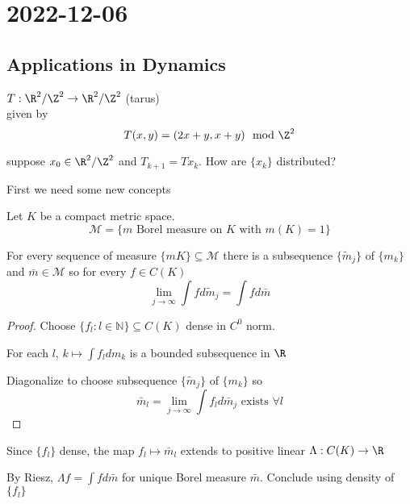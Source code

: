 \section{2022-12-06}

\subsection{Applications in Dynamics}

\begin{definition}
	$T : \R^2 / \Z^2 \to \R^2 / \Z^2$ (tarus) \\
	given by
	\[
		T(x,y) = (2x + y, x+y) \mod{\Z^2}
	\] 
\end{definition}

suppose $x_0 \in \R^2 / \Z^2$ and $T_{k+1} = T x_{k}$. How are $\{x_k\}$ distributed?


First we need some new concepts

\begin{definition}
	Let $K$ be a compact metric space.
	\[
		\mathcal{M} = \{ m \text{ Borel measure on $K$ with } m(K) = 1 \}
	\] 
\end{definition}

\begin{theorem}
	For every sequence of measure $\{m K \} \subseteq \mathcal{M}$ there is a subsequence
	$\{ \tilde{m}_{j}\}$ of $\{ m_k\}$ and $\bar{m} \in \mathcal{M}$ so for every $f \in C(K)$
	 \[
		 \lim_{j \to \infty} \int f d\tilde{m}_{j} = \int f d \bar{m}
	\] 
\end{theorem}

\begin{proof}
	Choose $\{ f_l : l \in \mathbb{N} \} \subseteq C(K)$ dense in $C^0$ norm.

	For each $l$, $k \mapsto \int f_{l} dm_k$ is a bounded subsequence in $\R$ 

	Diagonalize to choose subsequence $\{\tilde{m}_{j} \}$ of $\{m_k \}$ so
	\[
		\bar{m}_{l} = \lim_{j \to \infty} \int f_{l} d \bar{m}_j \text{ exists } \forall l
	\] 
\end{proof}

\begin{exercise}
	Since $\{f_l \}$ dense, the map $f_{l} \mapsto \bar{m}_l$ extends to positive linear $\Lambda : C(K) \to \R$

	By Riesz,  $\Lambda f = \int f d \bar{m}$ for unique Borel measure $\bar{m}$. Conclude using density of $\{f_l\}$
\end{exercise}

